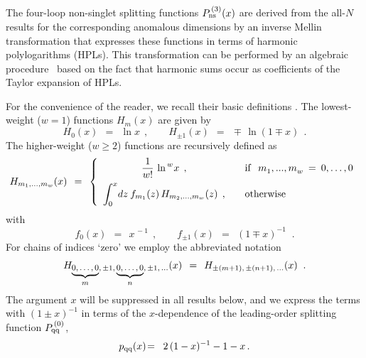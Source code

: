 \documentclass[12pt]{article}
\newcommand{\beq}{\begin{equation}}
\newcommand{\eeq}{\end{equation}}
\newcommand{\bea}{\begin{eqnarray}}
\newcommand{\eea}{\end{eqnarray}}
\def\pqq(#1){p_{\rm{qq}}(#1)}
\begin{document}
The four-loop non-singlet splitting functions $P_{\rm ns}^{\,(3)}(x)$ 
are derived from the all-$N$ results for the corresponding anomalous 
dimensions by an inverse Mellin transformation that expresses these 
functions in terms of harmonic polylogarithms (HPLs). 
This transformation can be performed by an algebraic procedure~%
\cite{Remiddi:1999ew,Moch:1999eb} based on the fact that harmonic sums 
occur as coefficients of the Taylor expansion of HPLs.

For the convenience of the reader, we recall their basic definitions 
\cite{Remiddi:1999ew}. The lowest-weight ($w = 1$) functions $H_m(x)$ 
are given by
%
\beq
\label{eq:HPL1}
  H_0(x)       \:\: = \:\:\ln x \:\: , \quad\quad
  H_{\pm 1}(x) \:\: = \:\: \mp \, \ln (1 \mp x) \:\: .
\eeq
%
The higher-weight ($w \geq 2$) functions are recursively defined as
%
\beq
\label{eq:HPL2}
  H_{m_1,...,m_w}(x) \:\: = \:\:
  \left\{ 
    \begin{array}{cl}
      \displaystyle{ \frac{1}{w!}\,\ln^{\,w\!} x \:\: ,}
      & 
      \quad {\rm if} \:\:\: m^{}_1,...,m^{}_w \:=\: 0,\ldots ,0 
      \\[2ex]
      \displaystyle{ 
        \int_0^x \! dz\: f_{m_1}(z) \, H_{m_2,...,m_w}(z)
        \:\: , } 
      & 
      \quad {\rm otherwise}
    \end{array} \right.
\eeq
%
with
\beq
\label{eq:HPLf}
  f_0^{}(x)       \:\: = \:\: x^{\,-1} \:\: , \quad\quad
  f_{\pm 1}^{}(x) \:\: = \:\: (1 \mp x)^{-1} \;\; .
\eeq
%
For chains of indices `zero' we employ the abbreviated notation
%
\beq
\label{eq:HPP-abbr}
  H_{{\footnotesize \underbrace{0,\ldots ,0}_{\scriptstyle m} },\,
  \pm 1,\, {\footnotesize \underbrace{0,\ldots ,0}_{\scriptstyle n} },
  \, \pm 1,\, \ldots}(x) \:\: = \:\: H_{\pm (m+1),\,\pm (n+1),\, \ldots}(x)
\;\; .
\eeq
%
The argument $x$ will be suppressed in all results below, and we express the 
terms with $(1 \pm x)^{-1}$ in terms of the $x$-dependence of the leading-order 
splitting function $P_{\rm qq}^{\,(0)}$,
%
\bea
  \pqq(x) &\! =\! & 2\, (1 - x)^{-1} - 1 - x \, .
\eea
\end{document}
